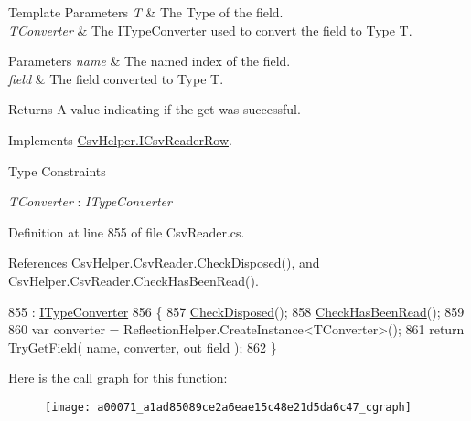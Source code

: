 \begin{DoxyTemplParams}{Template Parameters}
{\em T} & The Type of the field.\\
\hline
{\em T\-Converter} & The I\-Type\-Converter used to convert the field to Type T.\\
\hline
\end{DoxyTemplParams}

\begin{DoxyParams}{Parameters}
{\em name} & The named index of the field.\\
\hline
{\em field} & The field converted to Type T.\\
\hline
\end{DoxyParams}
\begin{DoxyReturn}{Returns}
A value indicating if the get was successful.
\end{DoxyReturn}


Implements \hyperlink{a00109_a9bd7b721a7b4acbc21050817aca71f21}{Csv\-Helper.\-I\-Csv\-Reader\-Row}.

\begin{Desc}
\item[Type Constraints]\begin{description}
\item[{\em T\-Converter} : {\em I\-Type\-Converter}]\end{description}
\end{Desc}


Definition at line 855 of file Csv\-Reader.\-cs.



References Csv\-Helper.\-Csv\-Reader.\-Check\-Disposed(), and Csv\-Helper.\-Csv\-Reader.\-Check\-Has\-Been\-Read().


\begin{DoxyCode}
855                                                                                                     : 
      \hyperlink{a00117}{ITypeConverter}
856         \{
857             \hyperlink{a00071_a6fa45a46ed1322dc1872ca2321b5edbc}{CheckDisposed}();
858             \hyperlink{a00071_a2d9249171ed1568e45d152766d364c31}{CheckHasBeenRead}();
859 
860             var converter = ReflectionHelper.CreateInstance<TConverter>();
861             \textcolor{keywordflow}{return} TryGetField( name, converter, out field );
862         \}
\end{DoxyCode}


Here is the call graph for this function\-:
\nopagebreak
\begin{figure}[H]
\begin{center}
\leavevmode
\texttt{[image: a00071\_a1ad85089ce2a6eae15c48e21d5da6c47\_cgraph]}
\end{center}
\end{figure}


